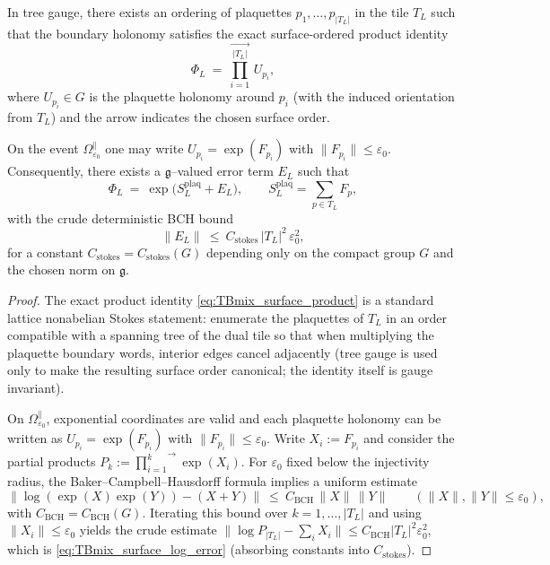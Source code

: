 \begin{lemma}\label{lem:TBmix_surface_log}
In tree gauge, there exists an ordering of plaquettes $p_1,\dots,p_{|T_L|}$ in the tile $T_L$ such that the boundary holonomy satisfies the
exact surface-ordered product identity
\begin{equation}\label{eq:TBmix_surface_product}
\Phi_L\ =\ \overrightarrow{\prod_{i=1}^{|T_L|}}\,U_{p_i},
\end{equation}
where $U_{p_i}\in G$ is the plaquette holonomy around $p_i$ (with the induced orientation from $T_L$) and the arrow indicates the chosen surface order.

On the event $\Omega_{\varepsilon_0}^{\parallel}$ one may write $U_{p_i}=\exp(F_{p_i})$ with $\|F_{p_i}\|\le\varepsilon_0$.
Consequently, there exists a $\mathfrak g$--valued error term $E_L$ such that
\begin{equation}\label{eq:TBmix_surface_log}
\Phi_L\ =\ \exp\!\big(S_L^{\mathrm{plaq}}+E_L\big),
\qquad S_L^{\mathrm{plaq}}=\sum_{p\in T_L}F_p,
\end{equation}
with the crude deterministic BCH bound
\begin{equation}\label{eq:TBmix_surface_log_error}
\|E_L\|\ \le\ C_{\mathrm{stokes}}\,|T_L|^2\,\varepsilon_0^2,
\end{equation}
for a constant $C_{\mathrm{stokes}}=C_{\mathrm{stokes}}(G)$ depending only on the compact group $G$ and the chosen norm on $\mathfrak g$.
\end{lemma}

\begin{proof}
The exact product identity \eqref{eq:TBmix_surface_product} is a standard lattice nonabelian Stokes statement:
enumerate the plaquettes of $T_L$ in an order compatible with a spanning tree of the dual tile so that when multiplying the plaquette boundary words,
interior edges cancel adjacently (tree gauge is used only to make the resulting surface order canonical; the identity itself is gauge invariant).

On $\Omega_{\varepsilon_0}^{\parallel}$, exponential coordinates are valid and each plaquette holonomy can be written as $U_{p_i}=\exp(F_{p_i})$
with $\|F_{p_i}\|\le\varepsilon_0$.
Write $X_i:=F_{p_i}$ and consider the partial products $P_k:=\overrightarrow{\prod_{i=1}^k}\exp(X_i)$.
For $\varepsilon_0$ fixed below the injectivity radius, the Baker--Campbell--Hausdorff formula implies a uniform estimate
\[
\big\|\log(\exp(X)\exp(Y))-(X+Y)\big\|\ \le\ C_{\mathrm{BCH}}\,\|X\|\,\|Y\|
\qquad(\|X\|,\|Y\|\le\varepsilon_0),
\]
with $C_{\mathrm{BCH}}=C_{\mathrm{BCH}}(G)$.
Iterating this bound over $k=1,\dots,|T_L|$ and using $\|X_i\|\le\varepsilon_0$ yields the crude estimate
$\|\log P_{|T_L|}-\sum_{i}X_i\|\le C_{\mathrm{BCH}}|T_L|^2\varepsilon_0^2$,
which is \eqref{eq:TBmix_surface_log_error} (absorbing constants into $C_{\mathrm{stokes}}$).
\end{proof}


